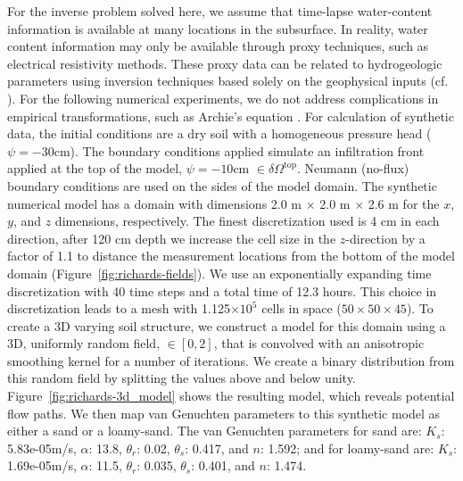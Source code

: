 \documentclass[preprint,review,3p,times,onecolumn,authoryear]{elsarticle}
\begin{document}
For the inverse problem solved here, we assume that time-lapse water-content information is available at many locations in the subsurface. In reality, water content information may only be available through proxy techniques, such as electrical resistivity methods. These proxy data can be related to hydrogeologic parameters using inversion techniques based solely on the geophysical inputs (cf. \cite{Mawer2013}). For the following numerical experiments, we do not address complications in empirical transformations, such as Archie's equation \citep{Archie1942}. For calculation of synthetic data, the initial conditions are a dry soil with a homogeneous pressure head ($\psi=-30$cm). The boundary conditions applied simulate an infiltration front applied at the top of the model, $\psi = -10$cm $\in \delta\Omega^\text{top}$. Neumann (no-flux) boundary conditions are used on the sides of the model domain. The synthetic numerical model has a domain with dimensions 2.0 m $\times$ 2.0 m $\times$ 2.6 m for the $x$, $y$, and $z$ dimensions, respectively. The finest discretization used is 4 cm in each direction, after 120 cm depth we increase the cell size in the $z$-direction by a factor of 1.1 to distance the measurement locations from the bottom of the model domain (Figure~\ref{fig:richards-fields}). We use an exponentially expanding time discretization with 40 time steps and a total time of 12.3 hours. This choice in discretization leads to a mesh with 1.125$\times10^5$ cells in space ($50 \times 50 \times 45$). To create a 3D varying soil structure, we construct a model for this domain using a 3D, uniformly random field, $\in [0, 2]$, that is convolved with an anisotropic smoothing kernel for a number of iterations. We create a binary distribution from this random field by splitting the values above and below unity. Figure~\ref{fig:richards-3d_model} shows the resulting model, which reveals potential flow paths. We then map van Genuchten parameters to this synthetic model as either a sand or a loamy-sand. The van Genuchten parameters for sand are: $K_s$: 5.83e-05m/s, $\alpha$: 13.8, $\theta_r$: 0.02, $\theta_s$: 0.417, and  $n$: 1.592; and for loamy-sand are: $K_s$: 1.69e-05m/s, $\alpha$: 11.5, $\theta_r$: 0.035, $\theta_s$: 0.401, and  $n$: 1.474.
\end{document}
